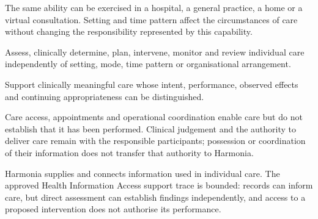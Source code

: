 The same ability can be exercised in a hospital, a general practice, a home or a virtual consultation. Setting and time pattern affect the circumstances of care without changing the responsibility represented by this capability.



Assess, clinically determine, plan, intervene, monitor and review individual care independently of setting, mode, time pattern or organisational arrangement.



Support clinically meaningful care whose intent, performance, observed effects and continuing appropriateness can be distinguished.



Care access, appointments and operational coordination enable care but do not establish that it has been performed. Clinical judgement and the authority to deliver care remain with the responsible participants; possession or coordination of their information does not transfer that authority to Harmonia.



Harmonia supplies and connects information used in individual care. The approved Health Information Access support trace is bounded: records can inform care, but direct assessment can establish findings independently, and access to a proposed intervention does not authorise its performance.


